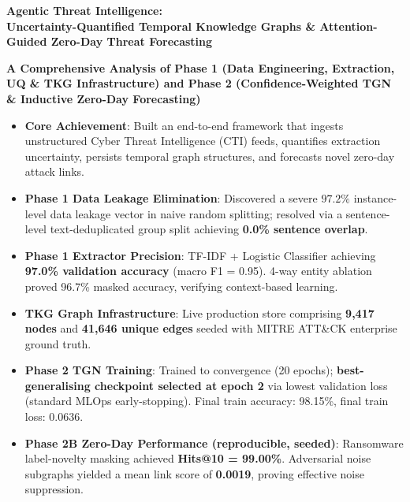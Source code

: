 \documentclass[11pt,a4paper]{article}
\begin{document}
\begin{titlepage}
    \centering
    \vspace*{1cm}
    
    {\Huge \bfseries \color{primary} Agentic Threat Intelligence: \\ Uncertainty-Quantified Temporal Knowledge Graphs \& Attention-Guided Zero-Day Threat Forecasting \par}
    
    \vspace{1.2cm}
    {\Large \bfseries A Comprehensive Analysis of Phase 1 (Data Engineering, Extraction, UQ \& TKG Infrastructure) and Phase 2 (Confidence-Weighted TGN \& Inductive Zero-Day Forecasting) \par}
    
    \vspace{1.8cm}
    
    \begin{tcolorbox}[colback=lightbg, colframe=primary, title=Executive Project Summary \& Benchmark Results, width=0.95\textwidth]
    \small
    \begin{itemize}[leftmargin=*]
        \item \textbf{Core Achievement}: Built an end-to-end framework that ingests unstructured Cyber Threat Intelligence (CTI) feeds, quantifies extraction uncertainty, persists temporal graph structures, and forecasts novel zero-day attack links.
        \item \textbf{Phase 1 Data Leakage Elimination}: Discovered a severe $97.2\%$ instance-level data leakage vector in naive random splitting; resolved via a sentence-level text-deduplicated group split achieving \textbf{0.0\% sentence overlap}.
        \item \textbf{Phase 1 Extractor Precision}: TF-IDF + Logistic Classifier achieving \textbf{97.0\% validation accuracy} (macro F1 = 0.95). 4-way entity ablation proved 96.7\% masked accuracy, verifying context-based learning.
        \item \textbf{TKG Graph Infrastructure}: Live production store comprising \textbf{9,417 nodes} and \textbf{41,646 unique edges} seeded with MITRE ATT\&CK enterprise ground truth.
        \item \textbf{Phase 2 TGN Training}: Trained to convergence (20 epochs); \textbf{best-generalising checkpoint selected at epoch 2} via lowest validation loss (standard MLOps early-stopping). Final train accuracy: 98.15\%, final train loss: 0.0636.
        \item \textbf{Phase 2B Zero-Day Performance (reproducible, seeded)}: Ransomware label-novelty masking achieved \textbf{Hits@10 = 99.00\%}. Adversarial noise subgraphs yielded a mean link score of \textbf{0.0019}, proving effective noise suppression.
    \end{itemize}
    \end{tcolorbox}
    

\end{titlepage}
\end{document}
